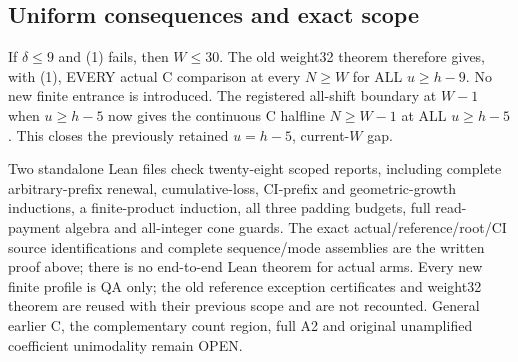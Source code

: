 \subsection*{Uniform consequences and exact scope}
If $\delta\le9$ and (1) fails, then $W\le30$. The old weight32
theorem therefore gives, with (1), EVERY actual C comparison at every
$N\ge W$ for ALL $u\ge h-9$. No new finite entrance is introduced.
The registered all-shift boundary at $W-1$ when $u\ge h-5$ now gives
the continuous C halfline $N\ge W-1$ at ALL $u\ge h-5$. This closes
the previously retained $u=h-5$, current-$W$ gap.

Two standalone Lean files check twenty-eight scoped reports, including
complete arbitrary-prefix renewal, cumulative-loss, CI-prefix and
geometric-growth inductions, a finite-product induction, all three
padding budgets, full read-payment algebra and all-integer cone guards.
The exact actual/reference/root/CI source identifications and complete
sequence/mode assemblies are the written proof above; there is no
end-to-end Lean theorem for actual arms. Every new finite profile is
QA only; the old reference exception certificates and weight32 theorem
are reused with their previous scope and are not recounted.
General earlier C, the complementary count region, full A2 and original
unamplified coefficient unimodality remain OPEN.
